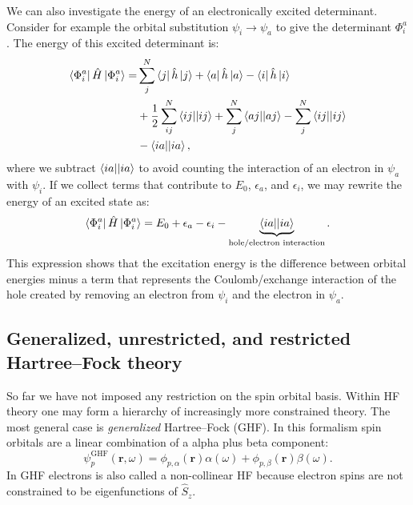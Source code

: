 \documentclass[../Main/chem532-notes.tex]{subfiles}
\begin{document}
We can also investigate the energy of an electronically excited determinant. Consider for example the orbital substitution $\psi_i \rightarrow \psi_a$ to give the determinant $\Phi_{i}^{a}$. The energy of this excited determinant is:
\begin{equation}
\begin{split}
\bra{\Phi_{i}^{a}} \hat{H} \ket{\Phi_{i}^{a}}
=&  \sum_j^{N} \bra{j}\hat{h}\ket{j} 
+ \bra{a} \hat{h} \ket{a}
- \bra{i} \hat{h} \ket{i}\\
&+ \frac{1}{2} \sum_{ij}^{N} \bra{ij}\!\ket{ij} 
+ \sum_{j}^{N} \bra{aj}\!\ket{aj} 
- \sum_{j}^{N} \bra{ij}\!\ket{ij} \\
&-\bra{ia}\!\ket{ia},
\end{split}
\end{equation}
where we subtract $\bra{ia}\!\ket{ia}$ to avoid counting the interaction of an electron in $\psi_a$ with $\psi_i$.
If we collect terms that contribute to $E_0$, $\epsilon_a$, and $\epsilon_i$, we may rewrite the energy of an excited state as:
\begin{equation}
\bra{\Phi_{i}^{a}} \hat{H} \ket{\Phi_{i}^{a}} =
E_0 + \epsilon_a - \epsilon_i -\underbrace{\bra{ia}\!\ket{ia}}_{\text{hole/electron interaction}}.
\end{equation}
This expression shows that the excitation energy is the difference between orbital energies minus a term that represents the Coulomb/exchange interaction of the hole created by removing an electron from $\psi_i$ and the electron in $\psi_a$.


\subsection{Generalized, unrestricted, and restricted Hartree--Fock theory}
So far we have not imposed any restriction on the spin orbital basis.
Within HF theory one may form a hierarchy of increasingly more constrained theory.
The most general case is \textit{generalized} Hartree--Fock (GHF).
In this formalism spin orbitals are a linear combination of a alpha plus beta component:
\begin{equation}
\psi_p^\mathrm{GHF}(\mathbf{r},\omega) 
= \phi_{p,\alpha}(\mathbf{r}) \alpha(\omega) +
\phi_{p,\beta}(\mathbf{r}) \beta(\omega).
\end{equation}
In GHF electrons is also called a non-collinear HF because electron spins are not constrained to be eigenfunctions of $\hat{S}_z$.
\end{document}
